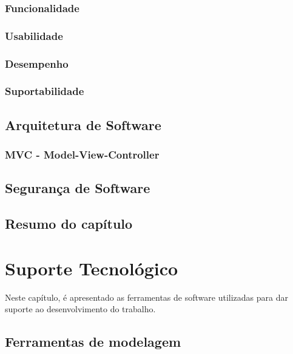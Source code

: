 \subsection{Funcionalidade}
\label{subsec:funcionalidade}

\subsection{Usabilidade}
\label{subsec:usabilidade}

\subsection{Desempenho}
\label{subsec:desempenho}

\subsection{Suportabilidade}
\label{subsec:suportabilidade}

\section{Arquitetura de Software}
\label{sec:arquitetura}

\subsection{MVC - Model-View-Controller}
\label{subsec:mvc}

\section{Segurança de Software}
\label{sec:seguranca}

\section{Resumo do capítulo}


\chapter{Suporte Tecnológico}

Neste capítulo, é apresentado as ferramentas de software utilizadas para dar suporte ao desenvolvimento do trabalho. 

\section{Ferramentas de modelagem}
\label{sec:ferramentasModelagem}


